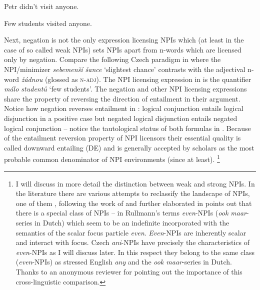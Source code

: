\documentclass[output=paper,
]{langscibook}
\begin{document}
\label{ex-8}
\z

\ea \label{ex-9} Petr didn't visit anyone.
\z
\z

\ea Few students visited anyone.\label{ex-9-5}
\z

\noindent Next, negation is not the only expression licensing NPIs which (at least in the case of so called weak NPIs) sets NPIs apart from n-words which are licensed only by negation. Compare the following Czech paradigm in  where the NPI/minimizer \textit{sebemenší šance} `slightest chance' contrasts with the adjectival n-word \textit{žádnou} (glossed as \textsc{n-adj}). The NPI licensing expression in  is the quantifier \textit{málo studentů} `few students'. The negation and other  NPI licensing expressions share the property of reversing the direction of entailment in their argument. Notice how negation reverses entailment in : logical conjunction entails logical disjunction in a positive case but negated logical disjunction entails negated logical conjunction -- notice the tautological status of both formulas in . Because of the entailment reversion property of NPI licensors their essential quality is called downward entailing (DE) and is generally accepted by scholars as the most probable common denominator of NPI environments (since \citealt{ladusaw1992expressing} at least).%
\footnote{I will discuss in more detail the distinction between weak and strong NPIs. In the literature there are various attempts to reclassify the landscape of NPIs, one of them \citealt{rullmann1996two}, following the work of \citealt{krifka1995semantics} and further elaborated in \citealt{lahiri1998focus} points out that there is a special class of NPIs -- in Rullmann's terms \textit{even}-NPIs (\textit{ook maar}-series in Dutch) which seem to be an indefinite incorporated with the semantics of the scalar focus particle \textit{even}. \textit{Even}-NPIs are inherently scalar and interact with focus. Czech \textit{ani}-NPIs have precisely the characteristics of \textit{even}-NPIs as I will discuss later. In this respect they belong to the same class (\textit{even}-NPIs) as stressed English \textit{any} and the \textit{ook maar}-series in Dutch. Thanks to an anonymous reviewer for pointing out the importance of this cross-linguistic comparison.}
\end{document}
